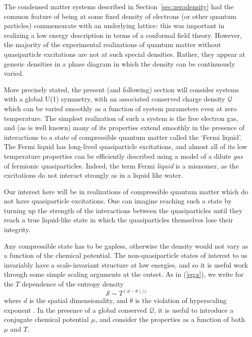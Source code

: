\documentclass[10pt, oneside]{book}
\def\beq{\begin{equation}}
\def\eeq{\end{equation}}
\begin{document}
\begin{doublespace}
The condensed matter systems described in Section~\ref{sec:zerodensity} had the common feature of being at some
fixed density of electrons (or other quantum particles) commensurate with an underlying lattice: this was important in 
realizing a low energy description in terms of a conformal field theory. However, the majority of the experimental realizations of quantum
matter without quasiparticle excitations are not at such special densities. Rather, they appear at generic densities in a phase diagram
in which the density can be continuously varied. 

More precisely stated, the present (and following) section will consider systems with a global U(1) symmetry, with
an associated conserved charge density $\mathcal{Q}$ which can be varied smoothly as a function of system
parameters even at zero temperature. The simplest realization of such a system is the free electron gas,
and (as is well known) many of its properties extend smoothly in the presence of interactions to a state of
compressible quantum matter called the `Fermi liquid'. The Fermi liquid has long-lived quasiparticle excitations,
and almost all of its low temperature properties can be efficiently described using a model of a dilute {\em gas\/}
of fermionic quasiparticles. Indeed, the term Fermi {\em liquid\/} is a misnomer, as the excitations do not interact
strongly as in a liquid like water. 

Our interest here will be in realizations of compressible quantum matter which do not have quasiparticle
excitations. One can imagine reaching such a state by turning up the strength of the 
interactions between the quasiparticles until they reach a true liquid-like state in which the 
quasiparticles themselves lose their integrity. 

Any compressible state has to be gapless, otherwise the density would not vary as a function of the chemical potential.
The non-quasiparticle states of interest to us invariably have a scale-invariant structure at low energies,
and so it is useful work through some simple scaling arguments at the outset. As in (\ref{eq:s}),
we write for the $T$ dependence of the entropy density
\beq
\mathcal{S} \sim T^{(d-\theta)/z}  \label{eq:entT}
\eeq
where $d$ is the spatial dimensionality, and $\theta$ is the violation of hyperscaling exponent \cite{Huijse:2011ef}.
In the presence of a global conserved $\mathcal{Q}$, it is useful to introduce a conjugate chemical potential $\mu$,
and consider the properties as a function of both $\mu$ and $T$.


\end{doublespace}
\end{document}
